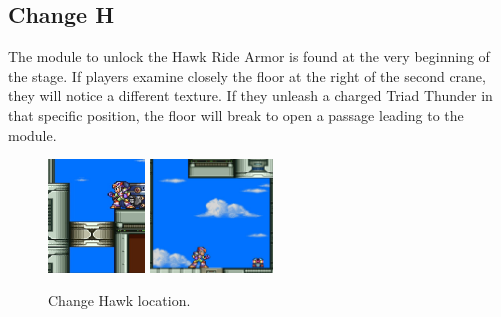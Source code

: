 \subsection{Change H}
The module to unlock the Hawk Ride Armor is found at the very beginning of the stage. If players examine closely the floor at the right of the second crane, they will notice a different texture. If they unleash a charged Triad Thunder in that specific position, the floor will break to open a passage leading to the module.
\begin{figure}[htp]
	\centering
	\includegraphics[height=3cm]{figures/X3/Crush_crawfish/hawk_1.jpg}
	\includegraphics[height=3cm]{figures/X3/Crush_crawfish/hawk_2.jpg}
	\caption{Change Hawk location.}
\end{figure}


